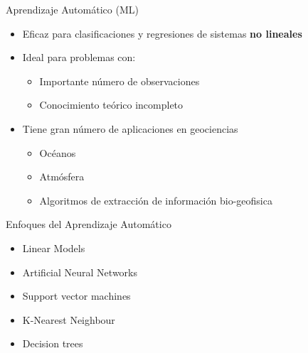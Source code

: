 \documentclass[10pt]{beamer}
\begin{document}
\begin{frame}{Aprendizaje Automático (ML)}

  \begin{itemize}[<+->]
  \item Eficaz para clasificaciones y regresiones de sistemas \textbf{no
    lineales}
  \item Ideal para problemas con:
    \begin{itemize}
    \item Importante número de observaciones
    \item Conocimiento teórico incompleto
    \end{itemize}
  \item Tiene gran número de aplicaciones en geociencias
    \begin{itemize}
    \item Océanos
    \item Atmósfera
    \item Algoritmos de extracción de información bio-geofisica
    \end{itemize}
  \end{itemize}

\end{frame}

\begin{frame}{Enfoques del Aprendizaje Automático}


  \begin{itemize}[<+->]
  \item Linear Models
  \item Artificial Neural Networks
  \item Support vector machines
  \item K-Nearest Neighbour
  \item Decision trees
  \end{itemize}

\end{frame}
\end{document}
